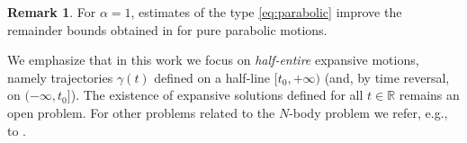 \documentclass[a4paper,10pt]{amsart}
\theoremstyle{plain}
\theoremstyle{definition}
\newtheorem{rem}[thm]{Remark}
\numberwithin{equation}{section}
\numberwithin{thm}{section}
\begin{document}
\begin{rem}
For $\alpha=1$, estimates of the type \eqref{eq:parabolic} improve the remainder bounds obtained in \cite{PolimeniTerracini} for pure parabolic motions.
\end{rem}

We emphasize that in this work we focus on \emph{half-entire} expansive motions, namely trajectories $\gamma(t)$ defined on a half-line $[t_0,+\infty)$ (and, by time reversal, on $(-\infty,t_0]$). The existence of expansive solutions defined for all $t\in\mathbb{R}$ remains an open problem. For other problems related to the $N$-body problem we refer, e.g., to \cite{MR1610784,paradela2022oscillatory}.



\end{document}
